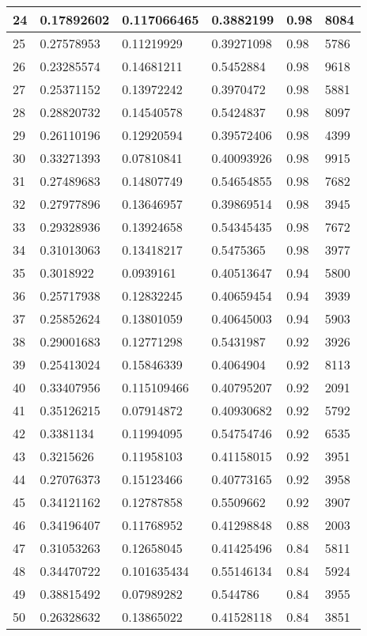 \begin{longtable}{|l|l|l|l|l|l|}
24 & 0.17892602 & 0.117066465 & 0.3882199 & 0.98 & 8084 \\ \hline 
25 & 0.27578953 & 0.11219929 & 0.39271098 & 0.98 & 5786 \\ \hline 
26 & 0.23285574 & 0.14681211 & 0.5452884 & 0.98 & 9618 \\ \hline 
27 & 0.25371152 & 0.13972242 & 0.3970472 & 0.98 & 5881 \\ \hline 
28 & 0.28820732 & 0.14540578 & 0.5424837 & 0.98 & 8097 \\ \hline 
29 & 0.26110196 & 0.12920594 & 0.39572406 & 0.98 & 4399 \\ \hline 
30 & 0.33271393 & 0.07810841 & 0.40093926 & 0.98 & 9915 \\ \hline 
31 & 0.27489683 & 0.14807749 & 0.54654855 & 0.98 & 7682 \\ \hline 
32 & 0.27977896 & 0.13646957 & 0.39869514 & 0.98 & 3945 \\ \hline 
33 & 0.29328936 & 0.13924658 & 0.54345435 & 0.98 & 7672 \\ \hline 
34 & 0.31013063 & 0.13418217 & 0.5475365 & 0.98 & 3977 \\ \hline 
35 & 0.3018922 & 0.0939161 & 0.40513647 & 0.94 & 5800 \\ \hline 
36 & 0.25717938 & 0.12832245 & 0.40659454 & 0.94 & 3939 \\ \hline 
37 & 0.25852624 & 0.13801059 & 0.40645003 & 0.94 & 5903 \\ \hline 
38 & 0.29001683 & 0.12771298 & 0.5431987 & 0.92 & 3926 \\ \hline 
39 & 0.25413024 & 0.15846339 & 0.4064904 & 0.92 & 8113 \\ \hline 
40 & 0.33407956 & 0.115109466 & 0.40795207 & 0.92 & 2091 \\ \hline 
41 & 0.35126215 & 0.07914872 & 0.40930682 & 0.92 & 5792 \\ \hline 
42 & 0.3381134 & 0.11994095 & 0.54754746 & 0.92 & 6535 \\ \hline 
43 & 0.3215626 & 0.11958103 & 0.41158015 & 0.92 & 3951 \\ \hline 
44 & 0.27076373 & 0.15123466 & 0.40773165 & 0.92 & 3958 \\ \hline 
45 & 0.34121162 & 0.12787858 & 0.5509662 & 0.92 & 3907 \\ \hline 
46 & 0.34196407 & 0.11768952 & 0.41298848 & 0.88 & 2003 \\ \hline 
47 & 0.31053263 & 0.12658045 & 0.41425496 & 0.84 & 5811 \\ \hline 
48 & 0.34470722 & 0.101635434 & 0.55146134 & 0.84 & 5924 \\ \hline 
49 & 0.38815492 & 0.07989282 & 0.544786 & 0.84 & 3955 \\ \hline 
50 & 0.26328632 & 0.13865022 & 0.41528118 & 0.84 & 3851 \\ \hline 
\end{longtable}